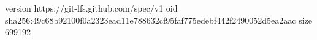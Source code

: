 version https://git-lfs.github.com/spec/v1
oid sha256:49c68b92100f0a2323ead11e788632cf95faf775edebf442f2490052d5ea2aac
size 699192
